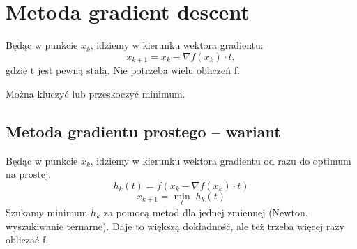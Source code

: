 \section{Metoda gradient descent}
Będąc w punkcie \( x_k \), idziemy w kierunku wektora gradientu:
\[
    x_{k+1} = x_k - \nabla f(x_k) \cdot t,
\]
gdzie t jest pewną stałą. Nie potrzeba wielu obliczeń f.
\begin{warning}
    Można kluczyć lub przeskoczyć minimum.
\end{warning}

\subsection{Metoda gradientu prostego – wariant}
Będąc w punkcie \( x_k \), idziemy w kierunku wektora gradientu od razu do optimum na prostej:
\[
    h_k(t) = f(x_k - \nabla f(x_k) \cdot t)
\]
\[
    x_{k+1} = \min_{t}\; h_k(t)
\]
Szukamy minimum \( h_k \) za pomocą metod dla jednej zmiennej (Newton, wyszukiwanie ternarne). Daje to większą dokładność, ale też trzeba więcej razy obliczać f.
